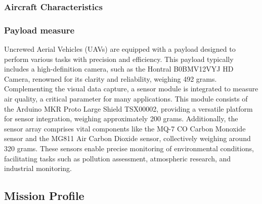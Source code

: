 \documentclass[12 pt]{article}
\begin{document}
\subsubsection{{Aircraft Characteristics}}
\begin{table}[h]
\centering
{}
\caption{Initial Mission Requirements}
\label{Mission Requirements}
\end{table}

\subsubsection{{Payload measure}}
Uncrewed Aerial Vehicles (UAVs) are equipped with a payload designed to perform various tasks with precision and efficiency. This payload typically includes a high-definition camera, such as the Hontral B0BMV12VYJ HD Camera, renowned for its clarity and reliability, weighing 492 grams. Complementing the visual data capture, a sensor module is integrated to measure air quality, a critical parameter for many applications. This module consists of the Arduino MKR Proto Large Shield TSX00002, providing a versatile platform for sensor integration, weighing approximately 200 grams. Additionally, the sensor array comprises vital components like the MQ-7 CO Carbon Monoxide sensor and the MG811 Air Carbon Dioxide sensor, collectively weighing around 320 grams. These sensors enable precise monitoring of environmental conditions, facilitating tasks such as pollution assessment, atmospheric research, and industrial monitoring.

\subsection{{Mission Profile}}
\end{document}
